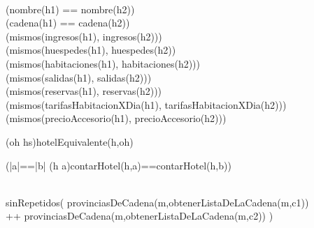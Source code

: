 \vspace{0.2cm}


\vspace{0.2cm}


\vspace{0.2cm}

{
	\\ (nombre(h1) == nombre(h2)) \land \\
	(cadena(h1) == cadena(h2)) \land \\
	(mismos(ingresos(h1), ingresos(h2))) \land \\
	(mismos(huespedes(h1), huespedes(h2)) \land \\
	(mismos(habitaciones(h1), habitaciones(h2))) \land \\
	(mismos(salidas(h1), salidas(h2))) \land \\
	(mismos(reservas(h1), reservas(h2))) \land \\
	(mismos(tarifasHabitacionXDia(h1), tarifasHabitacionXDia(h2))) \land \\
	(mismos(precioAccesorio(h1), precioAccesorio(h2)))
}

\vspace{0.2cm}

{
	(\exists oh \selec hs)hotelEquivalente(h,oh)
}

\vspace{0.2cm}


\vspace{0.2cm}


\vspace{0.2cm}

{
	(|a|==|b| \land (\forall h \selec a)contarHotel(h,a)==contarHotel(h,b))
}

\vspace{0.2cm}

{
	\\ sinRepetidos( provinciasDeCadena(m,obtenerListaDeLaCadena(m,c1))\\
	++ provinciasDeCadena(m,obtenerListaDeLaCadena(m,c2)) )
}


